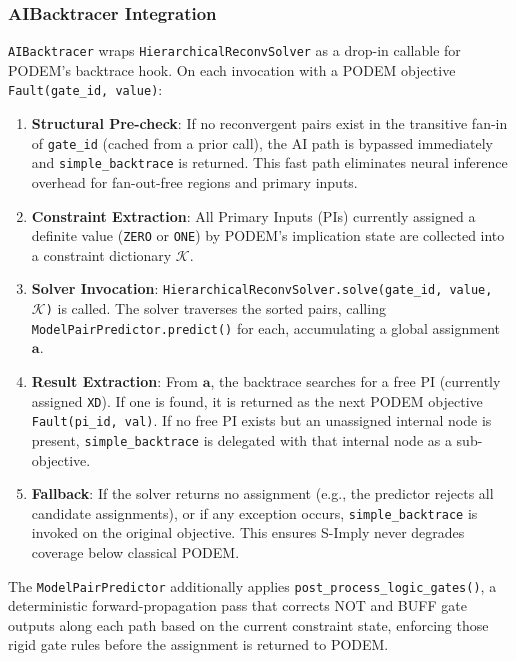 \documentclass[conference]{IEEEtran}
\begin{document}
\subsubsection{AIBacktracer Integration}
\label{sec:ai_backtracer}

\texttt{AIBacktracer} wraps \texttt{HierarchicalReconvSolver} as a drop-in callable for PODEM's backtrace hook. On each invocation with a PODEM objective \texttt{Fault(gate\_id, value)}:

\begin{enumerate}
   \item \textbf{Structural Pre-check}: If no reconvergent pairs exist in the transitive fan-in of \texttt{gate\_id} (cached from a prior call), the AI path is bypassed immediately and \texttt{simple\_backtrace} is returned. This fast path eliminates neural inference overhead for fan-out-free regions and primary inputs.
   \item \textbf{Constraint Extraction}: All Primary Inputs (PIs) currently assigned a definite value (\texttt{ZERO} or \texttt{ONE}) by PODEM's implication state are collected into a constraint dictionary $\mathcal{K}$.
   \item \textbf{Solver Invocation}: \texttt{HierarchicalReconvSolver.solve(gate\_id, value, $\mathcal{K}$)} is called. The solver traverses the sorted pairs, calling \texttt{ModelPairPredictor.predict()} for each, accumulating a global assignment $\mathbf{a}$.
   \item \textbf{Result Extraction}: From $\mathbf{a}$, the backtrace searches for a free PI (currently assigned \texttt{XD}). If one is found, it is returned as the next PODEM objective \texttt{Fault(pi\_id, val)}. If no free PI exists but an unassigned internal node is present, \texttt{simple\_backtrace} is delegated with that internal node as a sub-objective.
   \item \textbf{Fallback}: If the solver returns no assignment (e.g., the predictor rejects all candidate assignments), or if any exception occurs, \texttt{simple\_backtrace} is invoked on the original objective. This ensures S-Imply never degrades coverage below classical PODEM.
\end{enumerate}

The \texttt{ModelPairPredictor} additionally applies \texttt{post\_process\_logic\_gates()}, a deterministic forward-propagation pass that corrects NOT and BUFF gate outputs along each path based on the current constraint state, enforcing those rigid gate rules before the assignment is returned to PODEM.
\end{document}
